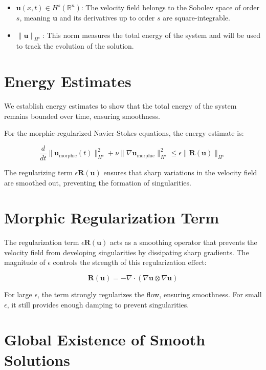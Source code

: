 \documentclass{article}
\begin{document}
\begin{itemize}
    \item \( \mathbf{u}(x, t) \in H^s(\mathbb{R}^n) \): The velocity field belongs to the Sobolev space of order \( s \), meaning \( \mathbf{u} \) and its derivatives up to order \( s \) are square-integrable.
    \item \( \| \mathbf{u} \|_{H^s} \): This norm measures the total energy of the system and will be used to track the evolution of the solution.
\end{itemize}

\section{Energy Estimates}

We establish energy estimates to show that the total energy of the system remains bounded over time, ensuring smoothness.

For the morphic-regularized Navier-Stokes equations, the energy estimate is:

\[
\frac{d}{dt} \| \mathbf{u}_{\text{morphic}}(t) \|_{H^s}^2 + \nu \| \nabla \mathbf{u}_{\text{morphic}} \|_{H^s}^2 \leq \epsilon \| \mathbf{R}(\mathbf{u}) \|_{H^s}
\]

The regularizing term \( \epsilon \mathbf{R}(\mathbf{u}) \) ensures that sharp variations in the velocity field are smoothed out, preventing the formation of singularities.

\section{Morphic Regularization Term}

The regularization term \( \epsilon \mathbf{R}(\mathbf{u}) \) acts as a smoothing operator that prevents the velocity field from developing singularities by dissipating sharp gradients. The magnitude of \( \epsilon \) controls the strength of this regularization effect:

\[
\mathbf{R}(\mathbf{u}) = -\nabla \cdot (\nabla \mathbf{u} \otimes \nabla \mathbf{u})
\]

For large \( \epsilon \), the term strongly regularizes the flow, ensuring smoothness. For small \( \epsilon \), it still provides enough damping to prevent singularities.

\section{Global Existence of Smooth Solutions}
\end{document}
